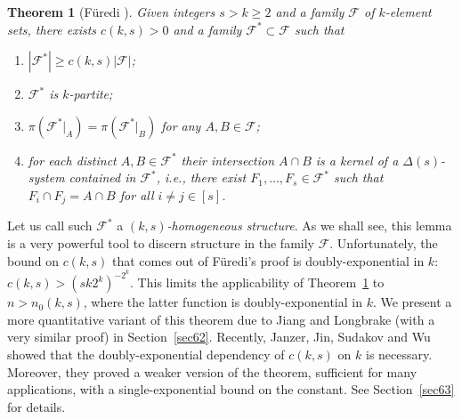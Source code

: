\documentclass[graybox]{svmult}
\renewcommand{\ge}{\geqslant}
\newcommand{\ff}{\mathcal{F}}
\newtheorem{thm}{Theorem}
\begin{document}
\begin{thm}[F\"uredi \cite{Fu1}]\label{thmfur} Given integers $s>k\ge 2$ and a family $\ff$ of $k$-element sets, there exists $c(k,s)>0$ and a family $\ff^*\subset \ff$ such that
\begin{enumerate}
  \item $|\ff^*|\ge c(k,s)|\ff|$;
  \item $\ff^*$ is $k$-partite;
  \item $\pi(\ff^*|_A) = \pi(\ff^*|_B)$ for any $A,B\in \ff$;
  \item for each distinct $A,B\in \ff^*$ their intersection $A\cap B$ is a kernel of a $\Delta(s)$-system contained in $\ff^*$, i.e., there exist $F_1,\ldots, F_s\in \ff^*$ such that $F_i\cap F_j = A\cap B$ for all $i\ne j\in[s]$.
\end{enumerate}
\end{thm}
Let us call such $\ff^*$ a {\it $(k,s)$-homogeneous structure}. As we shall see, this lemma is a very powerful tool to discern structure in the family $\ff$.
Unfortunately, the bound on $c(k,s)$ that comes out of F\"uredi's proof is doubly-exponential in $k$: $c(k,s)>(sk2^k)^{-2^k}$. This limits the applicability of Theorem~\ref{thmfur} to $n>n_0(k,s)$, where the latter function is doubly-exponential in $k$. We present a more quantitative variant of this theorem due to Jiang and Longbrake (with a very similar proof) in Section~\ref{sec62}. Recently, Janzer, Jin, Sudakov and Wu \cite{JJSW} showed that the doubly-exponential dependency of $c(k,s)$ on $k$ is necessary. Moreover, they proved a weaker version of the theorem, sufficient for many applications, with a single-exponential bound on the constant. See Section~\ref{sec63} for details.
\end{document}
